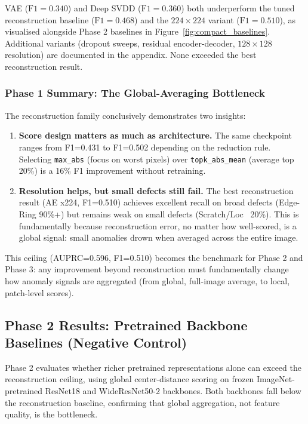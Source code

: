 \documentclass[11pt]{article}
\begin{document}
VAE ($\mathrm{F1}=0.340$) and Deep SVDD ($\mathrm{F1}=0.360$) both underperform the tuned reconstruction baseline
($\mathrm{F1}=0.468$) and the $224\!\times\!224$ variant ($\mathrm{F1}=0.510$), as visualised alongside
Phase 2 baselines in Figure~\ref{fig:compact_baselines}. Additional variants (dropout sweeps, residual encoder-decoder,
$128\!\times\!128$ resolution) are documented in the appendix. None exceeded the best reconstruction result.

\subsubsection{Phase 1 Summary: The Global-Averaging Bottleneck}

The reconstruction family conclusively demonstrates two insights:

\begin{enumerate}[leftmargin=1.5em]
  \item \textbf{Score design matters as much as architecture.} The same checkpoint ranges from F1=0.431 to F1=0.502 depending on the reduction rule. Selecting \texttt{max\_abs} (focus on worst pixels) over \texttt{topk\_abs\_mean} (average top 20\%) is a 16\% F1 improvement without retraining.

  \item \textbf{Resolution helps, but small defects still fail.} The best reconstruction result (AE x224, F1=0.510) achieves excellent recall on broad defects (Edge-Ring 90\%+) but remains weak on small defects (Scratch/Loc ~20\%). This is fundamentally because reconstruction error, no matter how well-scored, is a global signal: small anomalies drown when averaged across the entire image.
\end{enumerate}

This ceiling (AUPRC=0.596, F1=0.510) becomes the benchmark for Phase 2 and Phase 3: any improvement beyond reconstruction must fundamentally change how anomaly signals are aggregated (from global, full-image average, to local, patch-level scores).

\subsection{Phase 2 Results: Pretrained Backbone Baselines (Negative Control)}

Phase 2 evaluates whether richer pretrained representations alone can exceed the reconstruction ceiling,
using global center-distance scoring on frozen ImageNet-pretrained ResNet18 and WideResNet50-2 backbones.
Both backbones fall below the reconstruction baseline, confirming that global aggregation, not feature quality, is the bottleneck.
\end{document}
